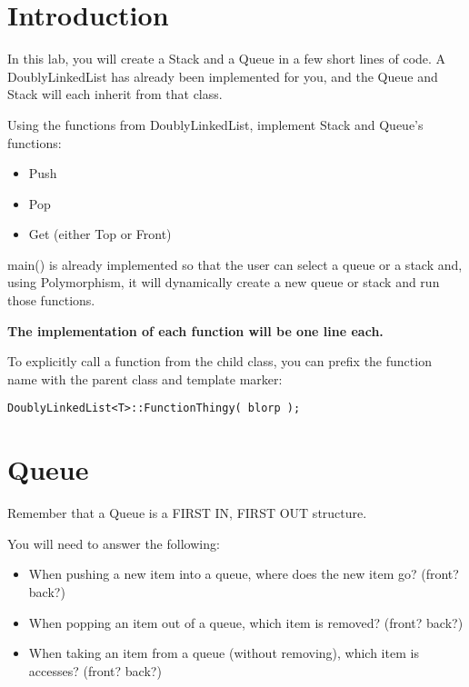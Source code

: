 \documentclass[a4paper,12pt,oneside]{book}
\begin{document}
    \newpage{}

    \section{Introduction}

    In this lab, you will create a Stack and a Queue in a few short lines of code. A DoublyLinkedList has already been implemented for you, and the Queue and Stack will each inherit from that class.

    Using the functions from DoublyLinkedList, implement Stack and Queue's functions:

    \begin{itemize}
        \item Push
        \item Pop
        \item Get (either Top or Front)
    \end{itemize}

    main() is already implemented so that the user can select a queue or a stack and, using Polymorphism, it will dynamically create a new queue or stack and run those functions.

    \textbf{The implementation of each function will be one line each.}

    To explicitly call a function from the child class, you can prefix the function name with the parent class and template marker:

\begin{lstlisting}[style=code]
DoublyLinkedList<T>::FunctionThingy( blorp );
\end{lstlisting}

    \newpage
    \section{Queue}

    Remember that a Queue is a FIRST IN, FIRST OUT structure.

    You will need to answer the following:

    \begin{itemize}
        \item   When pushing a new item into a queue, where does the new item go? (front? back?)
        \item   When popping an item out of a queue, which item is removed? (front? back?)
        \item   When taking an item from a queue (without removing), which item is accesses? (front? back?)
    \end{itemize}
    
\end{document}
